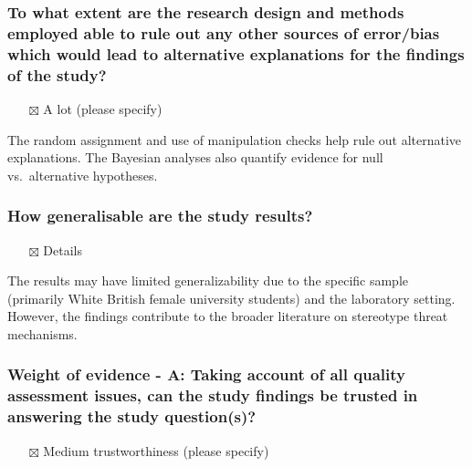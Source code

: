 \documentclass[
  doc, a4paper]{apa7}
\providecommand{\tightlist}{%
  \setlength{\itemsep}{0pt}\setlength{\parskip}{0pt}}
\begin{document}
\subsubsection{To what extent are the research design and methods employed able to rule out any other sources of error/bias which would lead to alternative explanations for the findings of the study?}\label{to-what-extent-are-the-research-design-and-methods-employed-able-to-rule-out-any-other-sources-of-errorbias-which-would-lead-to-alternative-explanations-for-the-findings-of-the-study}

\begin{itemize}
\tightlist
\item[$\boxtimes$]
  A lot (please specify)
\end{itemize}

The random assignment and use of manipulation checks help rule out alternative explanations. The Bayesian analyses also quantify evidence for null vs.~alternative hypotheses.

\subsubsection{How generalisable are the study results?}\label{how-generalisable-are-the-study-results}

\begin{itemize}
\tightlist
\item[$\boxtimes$]
  Details
\end{itemize}

The results may have limited generalizability due to the specific sample (primarily White British female university students) and the laboratory setting. However, the findings contribute to the broader literature on stereotype threat mechanisms.

\subsubsection{Weight of evidence - A: Taking account of all quality assessment issues, can the study findings be trusted in answering the study question(s)?}\label{weight-of-evidence---a-taking-account-of-all-quality-assessment-issues-can-the-study-findings-be-trusted-in-answering-the-study-questions}

\begin{itemize}
\tightlist
\item[$\boxtimes$]
  Medium trustworthiness (please specify)
\end{itemize}
\end{document}
